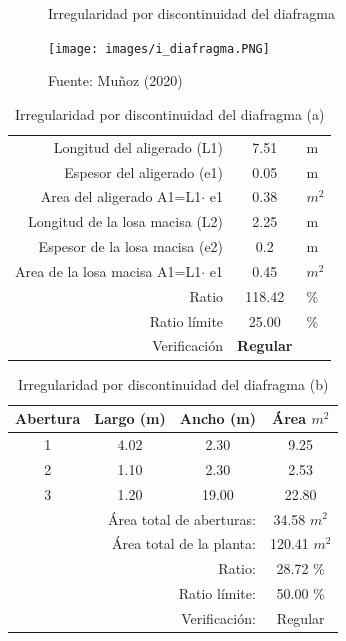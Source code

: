 \documentclass{article}%
\begin{document}
\begin{figure}[H]%
\centering%
\caption{Irregularidad por discontinuidad del diafragma}%
\texttt{[image: images/i\_diafragma.PNG]}%
\caption*{\small Fuente: Muñoz (2020)}%
\end{figure}

%
\vspace{-30pt}%


\begin{table}[H]%
\centering%
\caption{Irregularidad por discontinuidad del diafragma (a)}%
\begin{tabular}{llcr}%
\cline{1-3}%
\multicolumn{2}{r}{Longitud del aligerado (L1)} & 7.51 & \multicolumn{1}{l}{m} \\%
\multicolumn{2}{r}{Espesor del aligerado (e1)} & 0.05 & \multicolumn{1}{l}{m} \\%
\multicolumn{2}{r}{Area del aligerado A1=L1$\cdot$ e1} & 0.38 & \multicolumn{1}{l}{$m^2$} \\%
\multicolumn{2}{r}{Longitud de la losa macisa (L2)} & 2.25 & \multicolumn{1}{l}{m} \\%
\multicolumn{2}{r}{Espesor de la losa macisa (e2)} & 0.2 & \multicolumn{1}{l}{m} \\%
\multicolumn{2}{r}{Area de la losa macisa A1=L1$\cdot$ e1} & 0.45 & \multicolumn{1}{l}{$m^2$} \\%
\multicolumn{2}{r}{Ratio} & 118.42 & \multicolumn{1}{l}{\%} \\%
\multicolumn{2}{r}{Ratio límite} & 25.00 & \multicolumn{1}{l}{\%} \\%
\multicolumn{2}{r}{Verificación} & \textcolor[rgb]{ .267,  .447,  .769}{\textbf{Regular}} & \multicolumn{1}{l}{} \\%
\cline{1-3}%
\end{tabular}%
\end{table}

%
\vspace{-15pt}%


\begin{table}[H]%
\centering%
\caption{Irregularidad por discontinuidad del diafragma (b)}%
\begin{tabular}{cccc}%
\hline%
\textbf{Abertura}&\textbf{Largo (m)}&\textbf{Ancho (m)}&\textbf{Área $m^2$}\\%
\hline%
1&4.02&2.30&9.25\\%
\hline%
2&1.10&2.30&2.53\\%
\hline%
3&1.20&19.00&22.80\\%
\hline%
&\multicolumn{2}{r}{Área total de aberturas:}&34.58 $m^2$\\%
&\multicolumn{2}{r}{Área total de la planta:}&120.41 $m^2$\\%
&\multicolumn{2}{r}{Ratio:}&28.72 \%\\%
&\multicolumn{2}{r}{Ratio límite:}&50.00 \%\\%
&\multicolumn{2}{r}{Verificación:}&\textcolor[rgb]{ .267,  .447,  .769} {Regular}\\%
\end{tabular}%
\end{table}
\end{document}
